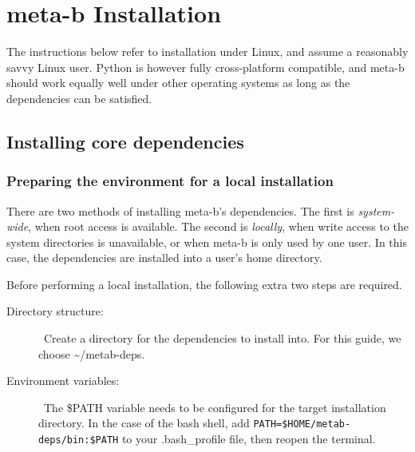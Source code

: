 

\chapter{meta-b Installation}

The instructions below refer to installation under Linux, and assume
a reasonably savvy Linux user.  Python is however fully cross-platform
compatible, and meta-b should work equally well under other operating
systems as long as the dependencies can be satisfied.

\section{Installing core dependencies}

\subsection{Preparing the environment for a local installation}

There are two methods of installing meta-b's dependencies. The first is
{\it system-wide}, when root access is available. The second is {\it locally},
when write access to the system directories is unavailable, or when meta-b is
only used by one user. In this case, the dependencies are installed into a
user's home directory.

Before performing a local installation, the following extra two steps are
required.

\begin{description}
  \item [Directory structure:] \
        Create a directory for the dependencies to install into. For this
        guide, we choose \~{}/metab-deps.
  \item [Environment variables:] \
        The \$PATH variable needs to be configured for the target installation
        directory. In the case of the bash shell, add
        {\tt PATH=\$HOME/metab-deps/bin:\$PATH} to your .bash\_profile file,
        then reopen the terminal.
\end{description}

